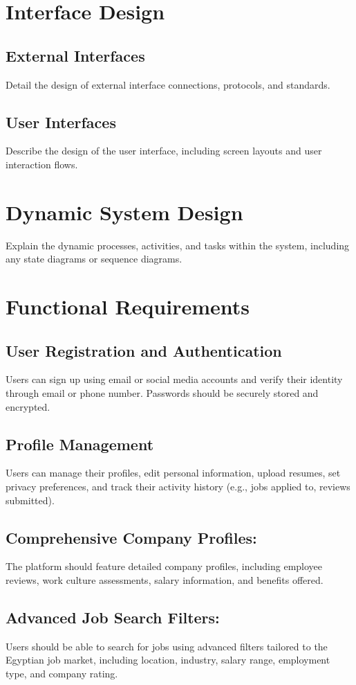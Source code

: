 \documentclass[titlepage]{article}
\begin{document}
\section{Interface Design}
\subsection{External Interfaces}
Detail the design of external interface connections, protocols, and standards.

\subsection{User Interfaces}
Describe the design of the user interface, including screen layouts and user interaction flows.

\section{Dynamic System Design}
Explain the dynamic processes, activities, and tasks within the system, including any state diagrams or sequence diagrams.

\section{Functional Requirements}
\subsection{User Registration and Authentication}
Users can sign up using email or social media accounts and verify their identity through email or phone number. Passwords should be securely stored and encrypted.
\subsection{Profile Management}
Users can manage their profiles, edit personal information, upload resumes, set privacy preferences, and track their activity history (e.g., jobs applied to, reviews submitted).
\subsection{Comprehensive Company Profiles:}
The platform should feature detailed company profiles, including employee reviews, work culture assessments, salary information, and benefits offered.

\subsection{Advanced Job Search Filters:}
Users should be able to search for jobs using advanced filters tailored to the Egyptian job market, including location, industry, salary range, employment type, and company rating.
\end{document}
